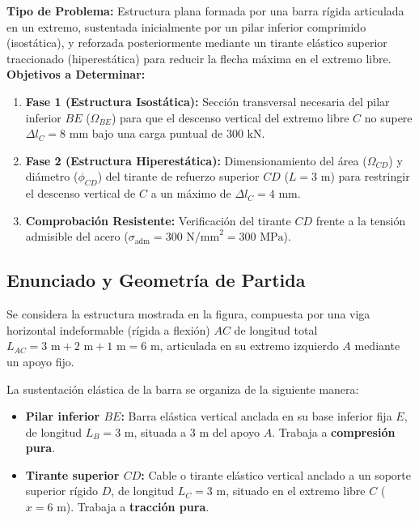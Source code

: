 \begin{tcolorbox}[colback=white, colframe=myb!80!black, arc=4pt, boxrule=0.9pt, left=8pt, right=8pt, top=7pt, bottom=7pt]
    \textbf{Tipo de Problema:} Estructura plana formada por una barra rígida articulada en un extremo, sustentada inicialmente por un pilar inferior comprimido (isostática), y reforzada posteriormente mediante un tirante elástico superior traccionado (hiperestática) para reducir la flecha máxima en el extremo libre.\\
    \textbf{Objetivos a Determinar:}
    \begin{enumerate}
        \item \textbf{Fase 1 (Estructura Isostática):} Sección transversal necesaria del pilar inferior $BE$ ($\Omega_{BE}$) para que el descenso vertical del extremo libre $C$ no supere $\Delta l_C = 8\text{ mm}$ bajo una carga puntual de $300\text{ kN}$.
        \item \textbf{Fase 2 (Estructura Hiperestática):} Dimensionamiento del área ($\Omega_{CD}$) y diámetro ($\phi_{CD}$) del tirante de refuerzo superior $CD$ ($L = 3\text{ m}$) para restringir el descenso vertical de $C$ a un máximo de $\Delta l_C = 4\text{ mm}$.
        \item \textbf{Comprobación Resistente:} Verificación del tirante $CD$ frente a la tensión admisible del acero ($\sigma_{\text{adm}} = 300\text{ N/mm}^2 = 300\text{ MPa}$).
    \end{enumerate}
\end{tcolorbox}

\subsection{Enunciado y Geometría de Partida}

Se considera la estructura mostrada en la figura, compuesta por una viga horizontal indeformable (rígida a flexión) $AC$ de longitud total $L_{AC} = 3\text{ m} + 2\text{ m} + 1\text{ m} = 6\text{ m}$, articulada en su extremo izquierdo $A$ mediante un apoyo fijo.

La sustentación elástica de la barra se organiza de la siguiente manera:
\begin{itemize}
    \item \textbf{Pilar inferior $BE$:} Barra elástica vertical anclada en su base inferior fija $E$, de longitud $L_B = 3\text{ m}$, situada a $3\text{ m}$ del apoyo $A$. Trabaja a \textbf{compresión pura}.
    \item \textbf{Tirante superior $CD$:} Cable o tirante elástico vertical anclado a un soporte superior rígido $D$, de longitud $L_C = 3\text{ m}$, situado en el extremo libre $C$ ($x = 6\text{ m}$). Trabaja a \textbf{tracción pura}.
\end{itemize}


